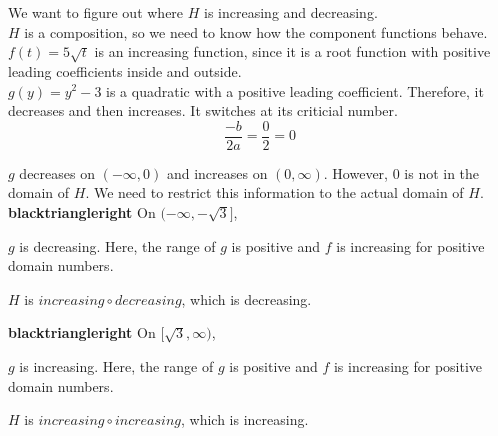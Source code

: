 \documentclass{ximera}
\begin{document}
We want to figure out where $H$ is increasing and decreasing. \\

$H$ is a composition, so we need to know how the component functions behave. \\





$f(t) = 5 \sqrt{t}$ is an increasing function, since it is a root function with positive leading coefficients inside and outside. \\

$g(y) = y^2 - 3$ is a quadratic with a positive leading coefficient.  Therefore, it decreases and then increases.   It switches at its criticial number.\\



\[
\frac{-b}{2 a} = \frac{0}{2} = 0
\]


$g$ decreases on $(-\infty, 0)$ and increases on $(0, \infty)$.  However, $0$ is not in the domain of $H$. We need to restrict this information to the actual domain of $H$. \\





\textbf{\textcolor{blue!55!black}{blacktriangleright}} On $(-\infty, -\sqrt{3}]$, 


$g$ is decreasing. Here, the range of $g$ is positive and $f$ is increasing for positive domain numbers. \\ 



\begin{center}
$H$ is $increasing \circ decreasing$, which is decreasing. \\
\end{center}





\textbf{\textcolor{blue!55!black}{blacktriangleright}} On $[\sqrt{3}, \infty)$, 


$g$ is increasing. Here, the range of $g$ is positive and $f$ is increasing for positive domain numbers. \\ 


\begin{center}
$H$ is $increasing \circ increasing$, which is increasing. \\
\end{center}
\end{document}
